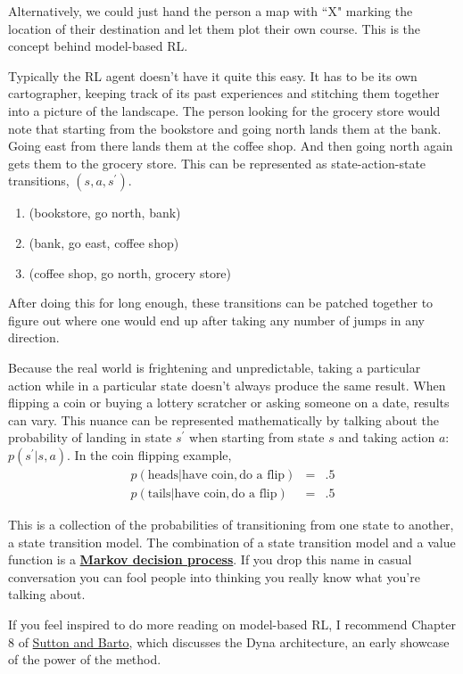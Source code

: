 Alternatively, we could just hand the person a map with ``X" marking the
location of their destination and let them plot their own course.
This is the concept behind model-based RL.

Typically the RL agent doesn't have it quite this easy. It has to be
its own cartographer, keeping track of its past experiences and stitching
them together into a picture of the landscape. The person looking for the
grocery store would note that starting from the bookstore and going
north lands them at the bank. Going east from there lands them at the
coffee shop. And then going north again gets them to the grocery store.
This can be represented as state-action-state transitions, $(s, a, s^\prime)$.
\begin{enumerate}
  \item{(bookstore, go north, bank)}
  \item{(bank, go east, coffee shop)}
  \item{(coffee shop, go north, grocery store)}
\end{enumerate}
After doing this for long enough, these transitions can be patched together
to figure out where one would end up after taking any number
of jumps in any direction.

Because the real world is frightening and unpredictable, taking a particular
action while in a particular state doesn't always produce the same result.
When flipping a coin or buying a lottery scratcher or asking someone on
a date, results can vary. This nuance can be represented mathematically by
talking about the probability of landing in state $s^\prime$ when starting
from state $s$ and taking action $a$: $p(s^\prime | s, a)$.
In the coin flipping example,
\begin{eqnarray*}
p(\mbox{heads} | \mbox{have coin}, \mbox{do a flip}) &=& .5 \\
p(\mbox{tails} | \mbox{have coin}, \mbox{do a flip}) &=& .5
\end{eqnarray*}

This is a collection of the probabilities of transitioning from one state
to another, a state transition model. The combination of a state transition
model and a value function is a
\textbf{\href{https://en.m.wikipedia.org/wiki/Markov_decision_process}{Markov decision process}}.
If you drop this name in casual conversation you can fool people into thinking
you really know what you're talking about.

If you feel inspired to do more reading on model-based RL,
I recommend Chapter 8 of
\href{http://incompleteideas.net/book/RLbook2020.pdf}{Sutton and Barto},
which discusses the Dyna architecture, an early showcase of
the power of the method.

